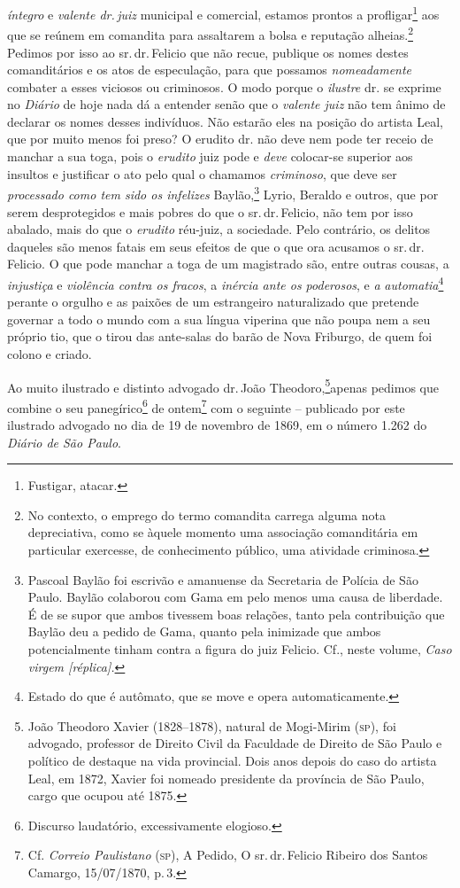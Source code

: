 \emph{íntegro} e \emph{valente dr.\,juiz} municipal e comercial, estamos
prontos a profligar\footnote{ Fustigar, atacar.} aos que se reúnem em
comandita para assaltarem a bolsa e reputação alheias.\footnote{ No
  contexto, o emprego do termo comandita carrega alguma nota
  depreciativa, como se àquele momento uma associação comanditária em
  particular exercesse, de conhecimento público, uma atividade
  criminosa.} Pedimos por isso ao sr.\,dr.\,Felicio que não recue,
publique os nomes destes comanditários e os atos de especulação, para
que possamos \emph{nomeadamente} combater a esses viciosos ou
criminosos. O modo porque o \emph{ilustre} dr. se exprime no
\emph{Diário} de hoje nada dá a entender senão que o \emph{valente juiz}
não tem ânimo de declarar os nomes desses indivíduos. Não estarão eles
na posição do artista Leal, que por muito menos foi preso? O erudito dr.
não deve nem pode ter receio de manchar a sua toga, pois o
\emph{erudito} juiz pode e \emph{deve} colocar-se superior aos insultos
e justificar o ato pelo qual o chamamos \emph{criminoso}, que deve ser
\emph{processado como tem sido os infelizes} Baylão,\footnote{ Pascoal
  Baylão foi escrivão e amanuense da Secretaria de Polícia de São Paulo.
  Baylão colaborou com Gama em pelo menos uma causa de liberdade. É de
  se supor que ambos tivessem boas relações, tanto pela contribuição que
  Baylão deu a pedido de Gama, quanto pela inimizade que ambos
  potencialmente tinham contra a figura do juiz Felicio. Cf., neste
  volume, \emph{Caso virgem {[}réplica{]}.}} Lyrio, Beraldo e outros,
que por serem desprotegidos e mais pobres do que o sr.\,dr.\,Felicio, não
tem por isso abalado, mais do que o \emph{erudito} réu-juiz, a
sociedade. Pelo contrário, os delitos daqueles são menos fatais em seus
efeitos de que o que ora acusamos o sr.\,dr.\,Felicio. O que pode manchar
a toga de um magistrado são, entre outras cousas, a \emph{injustiça} e
\emph{violência contra os fracos}, a \emph{inércia ante os poderosos}, e
\emph{a} \emph{automatia}\footnote{ Estado do que é autômato, que se
  move e opera automaticamente.} perante o orgulho e as paixões de um
estrangeiro naturalizado que pretende governar a todo o mundo com a sua
língua viperina que não poupa nem a seu próprio tio, que o tirou das
ante-salas do barão de Nova Friburgo, de quem foi colono e criado.

Ao muito ilustrado e distinto advogado dr.\,João Theodoro,\footnote{ João Theodoro Xavier (1828--1878), natural de Mogi-Mirim
  (\textsc{sp}), foi advogado, professor de Direito Civil da Faculdade de Direito
  de São Paulo e político de destaque na vida provincial. Dois anos
  depois do caso do artista Leal, em 1872, Xavier foi nomeado presidente
  da província de São Paulo, cargo que ocupou até 1875.}apenas pedimos
que combine o seu panegírico\footnote{ Discurso laudatório,
  excessivamente elogioso.} de ontem\footnote{ Cf. \emph{Correio
  Paulistano} (\textsc{sp}), A Pedido, O sr.\,dr.\,Felicio Ribeiro dos Santos
  Camargo, 15/07/1870, p.\,3.} com o seguinte -- publicado por este
ilustrado advogado no dia de 19 de novembro de 1869, em o número 1.262
do \emph{Diário de São Paulo}.

